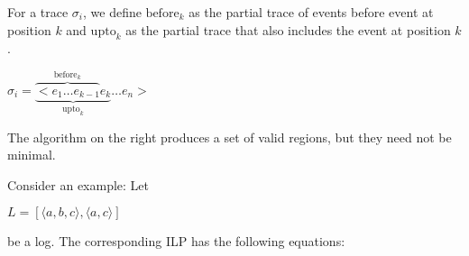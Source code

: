 \documentclass[english]{panikzettel}
\begin{document}
\begin{minipage}[t]{0.375\textwidth}
    For a trace $\sigma_i$, we define $\mathrm{before}_k$ as the partial trace of events before event at position $k$ and $\mathrm{upto}_k$ as the partial trace that also includes the event at position $k$.
    \begin{tightcenter}$\sigma_i = \underbrace{\overbrace{<e_1 \ldots e_{k-1}}^{\mathrm{before}_k} e_k}_{\mathrm{upto}_k} \ldots e_n>$\end{tightcenter}
    \medskip

    The algorithm on the right produces a set of valid regions, but they need not be minimal.

    Consider an example: Let \begin{tightcenter}$L = [\langle a,b,c \rangle , \langle a,c \rangle ]$\end{tightcenter} be a log.
    The corresponding ILP has the following equations:
\end{minipage}\hfill%
\end{document}
